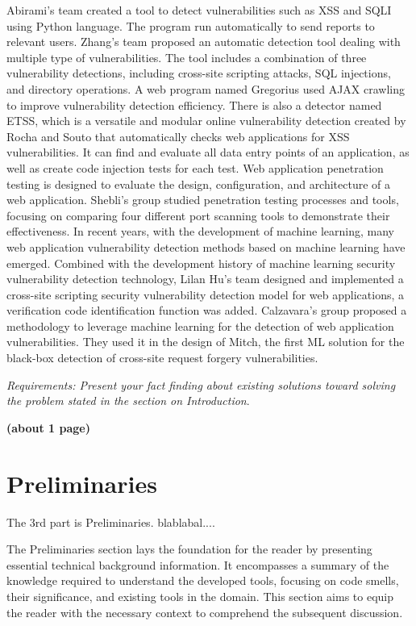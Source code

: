 \documentclass[journal]{IEEEtran}
\begin{document}
Abirami's team created a tool to detect vulnerabilities such as XSS and SQLI using Python language. The program run automatically to send reports to relevant users\cite{9155908}. Zhang's team proposed an automatic detection tool dealing with multiple type of vulnerabilities. The tool includes a combination of three vulnerability detections, including cross-site scripting attacks, SQL injections, and directory operations\cite{8983828}. A web program named Gregorius used AJAX crawling to improve vulnerability detection efficiency\cite{9092613}. There is also a detector named ETSS, which is a versatile and modular online vulnerability detection created by Rocha and Souto that automatically checks web applications for XSS vulnerabilities. It can find and evaluate all data entry points of an application, as well as create code injection tests for each test\cite{6924244}. Web application penetration testing is designed to evaluate the design, configuration, and architecture of a web application. Shebli's group  studied penetration testing processes and tools, focusing on comparing four different port scanning tools to demonstrate their effectiveness\cite{8378035}. In recent years, with the development of machine learning, many web application vulnerability detection methods based on machine learning have emerged. Combined with the development history of machine learning security vulnerability detection technology, Lilan Hu's team designed and implemented a cross-site scripting security vulnerability detection model for web applications, a verification code identification function was added\cite{article10.1088/1742-6596/1827/1/012061}. Calzavara's group proposed a methodology to leverage machine learning for the detection of web application vulnerabilities. They used it in the design of Mitch, the first ML solution for the black-box detection of cross-site request forgery vulnerabilities\cite{8966601}.

\vspace{1em}

\textit{Requirements: Present your fact finding about existing solutions toward solving the problem stated in the section on Introduction}. 

\textbf{(about 1 page)}

\section{Preliminaries}
\noindent The 3rd part is Preliminaries.
blablabal....

The Preliminaries section lays the foundation for the reader by presenting essential technical background information. It encompasses a summary of the knowledge required to understand the developed tools, focusing on code smells, their significance, and existing tools in the domain. This section aims to equip the reader with the necessary context to comprehend the subsequent discussion.
\end{document}
